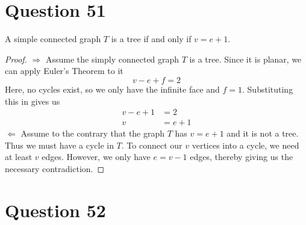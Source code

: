 \documentclass[11pt, oneside]{article}   	%
\begin{document}
\section*{Question 51}

A simple connected graph $T$ is a tree if and only if $v=e+1$.

\begin{proof}
$\Rightarrow$ Assume the simply connected graph $T$ is a tree. Since it is planar, we can apply Euler's Theorem to it
$$v - e + f = 2$$
Here, no cycles exist, so we only have the infinite face and $f=1$. Substituting this in gives us
\begin{align*}
	v - e + 1 & = 2 \\
	v & = e+ 1
\end{align*}
$\Leftarrow$ Assume to the contrary that the graph $T$ has $v=e+1$ and it is not a tree. Thus we must have a cycle in $T$. To connect our $v$ vertices into a cycle, we need at least $v$ edges. However, we only have $e=v-1$ edges, thereby giving us the necessary contradiction.
\end{proof}


\section*{Question 52}
\end{document}
